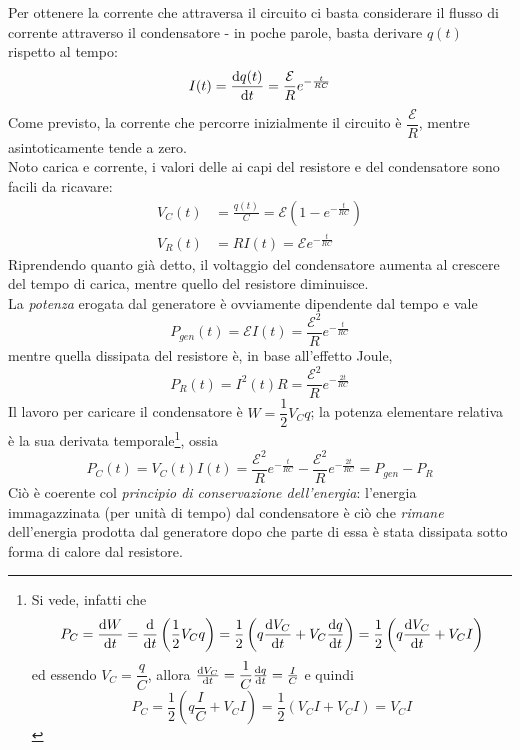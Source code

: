 Per ottenere la corrente che attraversa il circuito ci basta considerare il flusso di corrente attraverso il condensatore - in poche parole, basta derivare $q(t)$ rispetto al tempo:
\begin{equation}
	I(t)=\dv{q(t)}{t}=\frac{\mathcal{E}}{R}e^{-\frac{t}{RC}}
\end{equation}
Come previsto, la corrente che percorre inizialmente il circuito è $\dfrac{\mathcal{E}}{R}$, mentre asintoticamente tende a zero.\\
Noto carica e corrente, i valori delle \ddp ai capi del resistore e del condensatore sono facili da ricavare:
\begin{align}
	V_C(t)&=\frac{q(t)}{C}=\mathcal{E}\left(1-e^{-\frac{t}{RC}}\right)\\
	V_R(t)&=RI(t)=\mathcal{E}e^{-\frac{t}{RC}}
\end{align}
Riprendendo quanto già detto, il voltaggio del condensatore aumenta al crescere del tempo di carica, mentre quello del resistore diminuisce.\\
La \textit{potenza} erogata dal generatore è ovviamente dipendente dal tempo e vale
\begin{equation}
	P_{gen}(t)=\mathcal{E}I(t)=\frac{\mathcal{E}^2}{R}e^{-\frac{t}{RC}}
\end{equation}
mentre quella dissipata del resistore è, in base all'effetto Joule,
\begin{equation}
	P_{R}(t)=I^2(t)R=\frac{\mathcal{E}^2}{R}e^{-\frac{2t}{RC}}
\end{equation}
Il lavoro per caricare il condensatore è $W=\dfrac{1}{2}V_Cq$; la potenza elementare relativa è la sua derivata temporale\footnote{Si vede, infatti che
\begin{equation*}
	P_{C}=\dv{W}{t}=\dv{t}\left(\frac{1}{2}V_Cq\right)=\frac{1}{2}\left(q\dv{V_C}{t}+V_C\dv{q}{t}\right)=\frac{1}{2}\left(q\dv{V_C}{t}+V_CI\right)
\end{equation*}
ed essendo $V_C=\dfrac{q}{C}$, allora $\dv{V_C}{t}=\dfrac{1}{C}\dv{q}{t}=\frac{I}{C}$ e quindi
\begin{equation*}
	P_{C}=\frac{1}{2}\left(q\frac{I}{C}+V_CI\right)=\frac{1}{2}\left(V_CI+V_CI\right)=V_CI
\end{equation*}}, ossia 
\begin{equation}
	P_{C}(t)=V_C(t)I(t)=\frac{\mathcal{E}^2}{R}e^{-\frac{t}{RC}}-\frac{\mathcal{E}^2}{R}e^{-\frac{2t}{RC}}=P_{gen}-P_{R}
\end{equation}
Ciò è coerente col \textit{principio di conservazione dell'energia}: l'energia immagazzinata (per unità di tempo) dal condensatore è ciò che \textit{rimane} dell'energia prodotta dal generatore dopo che parte di essa è stata dissipata sotto forma di calore dal resistore.\\
